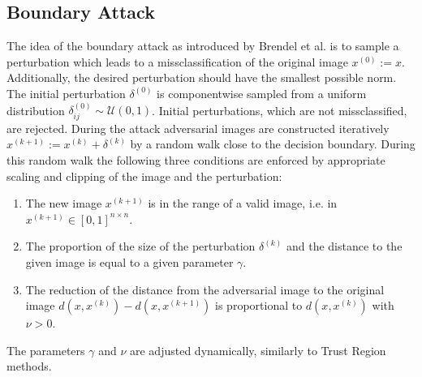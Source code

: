 \documentclass{article}
\begin{document}
\subsection{Boundary Attack}

The idea of the boundary attack as introduced by Brendel et
al.  is to sample a perturbation which leads to a
missclassification of the original image $x^{(0)}:=x$. Additionally,
the desired perturbation should have the smallest possible norm. The
initial perturbation $\delta^{(0)}$ is component\-wise sampled from a
uniform distribution $\delta^{(0)}_{ij}\sim \mathcal{U}(0,1)$. Initial
perturbations, which are not missclassified, are rejected. During the
attack adversarial images are constructed iteratively
$x^{(k+1)}:= x^{(k)}+\delta^{(k)}$ by a random walk close to the
decision boundary. During this random walk the following three
conditions are enforced by appropriate scaling and clipping of the
image and the perturbation:
\begin{enumerate}
\item The new image $x^{(k+1)}$ is in the range of a valid image,
  i.e. in $x^{(k+1)}\in [0,1]^{n\times n}$.
\item The proportion of the size of the perturbation $\delta^{(k)}$
  and the distance to the given image is equal to a given parameter
  $\gamma$.
\item The reduction of the distance from the adversarial image to the
  original image $d(x, x^{(k)})-d(x, x^{(k+1)})$ is proportional to
  $d(x, x^{(k)})$ with $\nu>0$.
\end{enumerate}
The parameters $\gamma$ and $\nu$ are adjusted dynamically, similarly to Trust Region methods.
\end{document}
